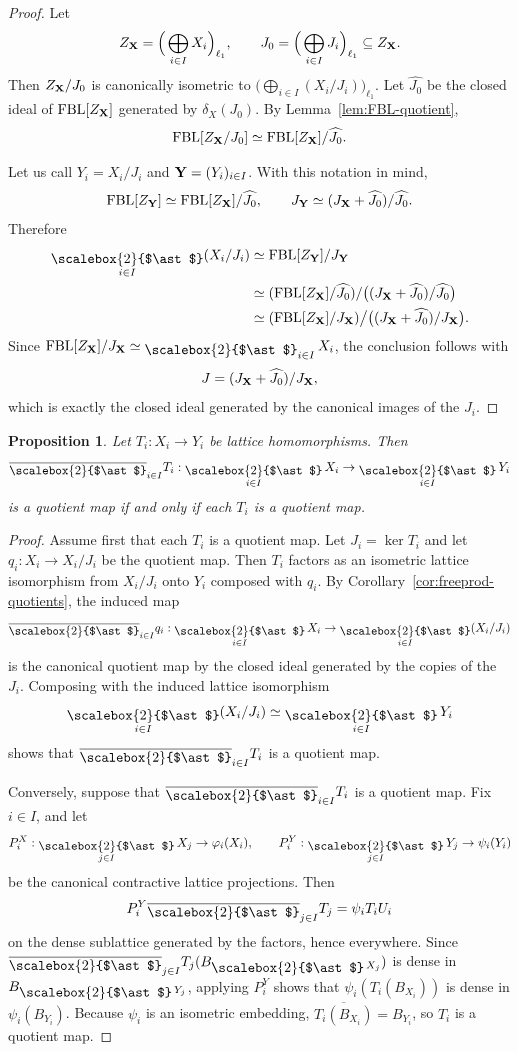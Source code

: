 \documentclass[12pt]{amsart}
\newcommand{\FBL}{\mathrm{FBL}}
\DeclareMathOperator*{\bigfree}{\raisebox{-0.6ex}{\scalebox{2}{$\ast$}}}
\theoremstyle{plain}
\newtheorem{proposition}[theorem]{Proposition}
\theoremstyle{definition}
\begin{document}
\begin{proof}
Let
\[
Z_{\bold{X}}=\Big(\bigoplus_{i\in I}X_i\Big)_{\ell_1},
\qquad
J_0=\Big(\bigoplus_{i\in I}J_i\Big)_{\ell_1}\subseteq Z_{\bold{X}}.
\]
Then $Z_{\bold{X}}/J_0$ is canonically isometric to $\big(\bigoplus_{i\in I}(X_i/J_i)\big)_{\ell_1}$. Let $\widehat{J_0}$ be the closed ideal of $\FBL[Z_{\bold{X}}]$ generated by $\delta_X(J_0)$. By Lemma~\ref{lem:FBL-quotient},
\[
\FBL[Z_{\bold{X}}/J_0]\simeq \FBL[Z_{\bold{X}}]/\widehat{J_0}.
\]

Let us call $Y_i=X_i/J_i$ and $\bold{Y}=(Y_i)_{i\in I}$. With this notation in mind, \[
\FBL[Z_{\bold Y}]\simeq \FBL[Z_{\bold X}]/\widehat {J_0},\qquad  J_{\bold Y}\simeq(J_{\bold{X}}+\widehat{J_0})/\widehat{J_0}.
\] Therefore
\begin{align*}
\bigfree_{i\in I}(X_i/J_i)
&\simeq \FBL[Z_{\bold Y}]/J_{\bold Y} \\
&\simeq (\FBL[Z_{\bold{X}}]/\widehat{J_0})/\big((J_\bold{X}+\widehat{J_0})/\widehat{J_0}\big) \\
&\simeq (\FBL[Z_{\bold{X}}]/J_{\bold{X}})\big/\big((J_{\bold{X}}+\widehat{J_0})/J_{\bold{X}}\big).
\end{align*}
Since $\FBL[Z_{\bold{X}}]/J_{\bold{X}}\simeq \bigfree_{i\in I}X_i$, the conclusion follows with
\[
J=(J_{\bold{X}}+\widehat{J_0})/J_{\bold{X}},
\]
which is exactly the closed ideal generated by the canonical images of the $J_i$.
\end{proof}
\begin{proposition}
Let $T_i:X_i\to Y_i$ be lattice homomorphisms. Then
\[
\overline{\bigfree}_{i\in I}T_i:\bigfree_{i\in I}X_i\to \bigfree_{i\in I}Y_i
\]
is a quotient map if and only if each $T_i$ is a quotient map.
\end{proposition}

\begin{proof}
Assume first that each $T_i$ is a quotient map. Let $J_i=\ker T_i$ and let $q_i:X_i\to X_i/J_i$ be the quotient map. Then $T_i$ factors as an isometric lattice isomorphism from $X_i/J_i$ onto $Y_i$ composed with $q_i$. By Corollary~\ref{cor:freeprod-quotients}, the induced map
\[
\overline{\bigfree}_{i\in I}q_i:\bigfree_{i\in I}X_i\to \bigfree_{i\in I}(X_i/J_i)
\]
is the canonical quotient map by the closed ideal generated by the copies of the $J_i$. Composing with the induced lattice isomorphism
\[
\bigfree_{i\in I}(X_i/J_i)\simeq \bigfree_{i\in I}Y_i
\]
shows that $\overline{\bigfree}_{i\in I}T_i$ is a quotient map.

Conversely, suppose that $\overline{\bigfree}_{i\in I}T_i$ is a quotient map. Fix $i\in I$, and let
\[
P_i^X:\bigfree_{j\in I}X_j\to \varphi_i(X_i),
\qquad
P_i^Y:\bigfree_{j\in I}Y_j\to \psi_i(Y_i)
\]
be the canonical contractive lattice projections. Then
\[
P_i^Y\overline{\bigfree}_{j\in I}T_j=\psi_i T_i U_i
\]
on the dense sublattice generated by the factors, hence everywhere. Since $\overline{\bigfree}_{j\in I}T_j(B_{\bigfree X_j})$ is dense in $B_{\bigfree Y_j}$, applying $P_i^Y$ shows that $\psi_i(T_i(B_{X_i}))$ is dense in $\psi_i(B_{Y_i})$. Because $\psi_i$ is an isometric embedding, $\overline{T_i(B_{X_i})}=B_{Y_i}$, so $T_i$ is a quotient map.
\end{proof}
\end{document}
